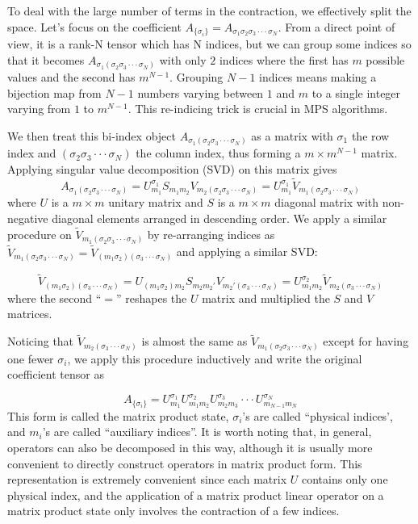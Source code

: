 \documentclass[english]{article}
\begin{document}
To deal with the large number of terms in the contraction, we effectively split the space. Let's focus on the coefficient $A_{\{\sigma_{i}\}}=A_{\sigma_{1}\sigma_{2}\sigma_{3}\cdot\cdot\cdot\sigma_{N}}$.
From a direct point of view, it is a rank-N tensor which has N indices,
but we can group some indices so that it becomes $A_{\sigma_{1}(\sigma_{2}\sigma_{3}\cdot\cdot\cdot\sigma_{N})}$
with only $2$ indices where the first has $m$ possible values and
the second has $m^{N-1}$. Grouping $N-1$ indices means making a
bijection map from $N-1$ numbers varying between $1$ and $m$ to
a single integer varying from $1$ to $m^{N-1}$. This re-indicing
trick is crucial in MPS algorithms.

We then treat this bi-index object $A_{\sigma_{1}(\sigma_{2}\sigma_{3}\cdot\cdot\cdot\sigma_{N})}$
as a matrix with $\sigma_{1}$ the row index and $(\sigma_{2}\sigma_{3}\cdot\cdot\cdot\sigma_{N})$
the column index, thus forming a $m\times m^{N-1}$ matrix. Applying
singular value decomposition (SVD) on this matrix gives 
\[
A_{\sigma_{1}(\sigma_{2}\sigma_{3}\cdot\cdot\cdot\sigma_{N})}=U_{m_{1}}^{\sigma_{1}}S_{m_{1}m_{2}}V_{m_{2}(\sigma_{2}\sigma_{3}\cdot\cdot\cdot\sigma_{N})}=U_{m_{1}}^{\sigma_{1}}\tilde{V}_{m_{1}(\sigma_{2}\sigma_{3}\cdot\cdot\cdot\sigma_{N})}
\]
where $U$ is a $m\times m$ unitary matrix and $S$ is a $m\times m$
diagonal matrix with non-negative diagonal elements arranged in descending
order. We apply a similar procedure on $\tilde{V}_{m_{1}(\sigma_{2}\sigma_{3}\cdot\cdot\cdot\sigma_{N})}$
by re-arranging indices as $\tilde{V}_{m_{1}(\sigma_{2}\sigma_{3}\cdot\cdot\cdot\sigma_{N})}=\tilde{V}_{(m_{1}\sigma_{2})(\sigma_{3}\cdot\cdot\cdot\sigma_{N})}$
and applying a similar SVD:

\[
\tilde{V}_{(m_{1}\sigma_{2})(\sigma_{3}\cdot\cdot\cdot\sigma_{N})}=U_{(m_{1}\sigma_{2})m_{2}}S_{m_{2}m_{2}'}V_{m_{2}'(\sigma_{3}\cdot\cdot\cdot\sigma_{N})}=U_{m_{1}m_{2}}^{\sigma_{2}}\tilde{V}_{m_{2}(\sigma_{3}\cdot\cdot\cdot\sigma_{N})}
\]
where the second ``$=$'' reshapes the $U$ matrix and multiplied
the $S$ and $V$ matrices. 

Noticing that $\tilde{V}_{m_{2}(\sigma_{3}\cdot\cdot\cdot\sigma_{N})}$
is almost the same as $\tilde{V}_{m_{1}(\sigma_{2}\sigma_{3}\cdot\cdot\cdot\sigma_{N})}$
except for having one fewer $\sigma_{i}$, we apply this procedure
inductively and write the original coefficient tensor as

\[
A_{\{\sigma_{i}\}}=U_{m_{1}}^{\sigma_{1}}U_{m_{1}m_{2}}^{\sigma_{2}}U_{m_{2}m_{3}}^{\sigma_{3}}\cdot\cdot\cdot U_{m_{N-1}m_{N}}^{\sigma_{N}}
\]
This form is called the matrix product state, $\sigma_{i}$'s
are called ``physical indices', and $m_{i}$'s are called ``auxiliary
indices''. It is worth noting that, in general, operators can also
be decomposed in this way, although it is usually more convenient
to directly construct operators in matrix product form. This representation
is extremely convenient since each matrix $U$ contains only one physical
index, and the application of a matrix product linear operator
on a matrix product state only involves the contraction of a few indices.
\end{document}

